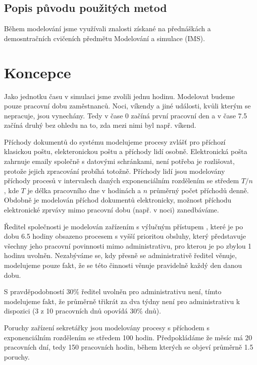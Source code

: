 \documentclass[12pt,a4paper]{article}
\begin{document}
\subsection{Popis původu použitých metod}

Během modelování jsme využívali znalosti získané na přednáškách a demosntračních cvičeních předmětu Modelování a simulace (IMS).

\newpage

\section{Koncepce}

Jako jednotku času v simulaci jsme zvolili jednu hodinu.
Modelovat \cite{ims-zakladni-pojmy} budeme pouze pracovní dobu zaměstnanců. Noci, víkendy a jiné události, kvůli kterým se nepracuje, jsou vynechány.
Tedy v čase 0 začíná první pracovní den a v čase 7.5 začíná druhý bez ohledu na to, zda mezi nimi byl např. víkend.

Příchody dokumentů do systému modelujeme procesy zvlášť pro příchozí klasickou poštu, elekteronickou poštu a příchody lidí osobně.
Elektronická pošta zahrnuje emaily společně s datovými schránkami, není potřeba je rozlišovat, protože jejich zpracování probíhá totožně.
Příchody lidí jsou modelovány příchody procesů v intervalech daných exponenciálním rozdělením se středem $T/n$ \cite{ims-rozlozeni}, kde $T$ je délka pracovního dne v ho\-di\-nách a $n$ průměrný počet příchodů denně.
Obdobně je modelován příchod dokumentů elektronicky, možnost příchodu elektronické zprvávy mimo pracovní dobu (např. v noci) zanedbáváme.

Ředitel společnosti je modelován zařízením s výlučným přístupem \cite{ims-zarizeni}, které je po dobu 6.5 hodiny obsazeno procesem s vyšší prioritou obsluhy,
který představuje všechny jeho pracovní povinnosti mimo administrativu, pro kterou je po zbylou 1 hodinu uvolněn.
Ne\-za\-bý\-vá\-me se, kdy přesně se administrativě ředitel věnuje, modelujeme pouze fakt, že se této činnosti věnuje pravidelně každý den danou dobu.

S pravděpodobností 30\% ředitel uvolněn pro administrativu není, tímto modelujeme fakt, že průměrně třikrát za dva týdny není pro administrativu k dispozici (3 z 10 pracovních dnů opovídá 30\% dnů).

Poruchy zařízení sekretářky jsou modelovány procesy s příchodem s exponenciálním rozdělením se středem 100 hodin. Předpokládáme že měsíc má 20 pracovních dní, tedy 150 pracovních hodin, během kterých se objeví průměrně 1.5 poruchy.
\end{document}
